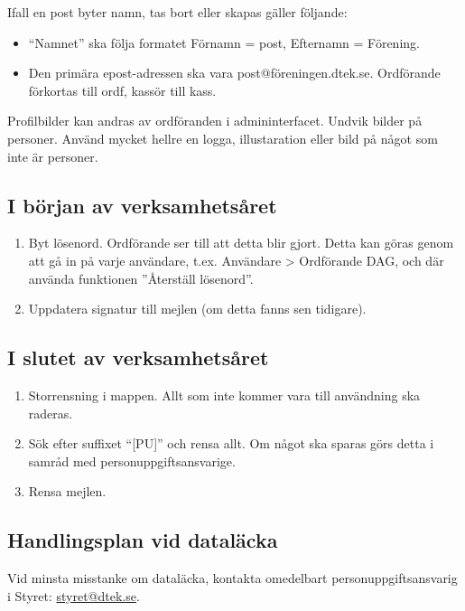 Ifall en post byter namn, tas bort eller skapas gäller följande:
\begin{itemize}
    \item ``Namnet'' ska följa formatet Förnamn = post, Efternamn = Förening.
    \item Den primära epost-adressen ska vara post@föreningen.dtek.se. Ordförande förkortas till ordf, kassör till kass.
\end{itemize}

Profilbilder kan andras av ordföranden i admininterfacet. Undvik bilder på personer. Använd mycket hellre en logga, illustaration eller bild på något som inte är personer. 

\subsection{I början av verksamhetsåret}

\begin{enumerate}
    \item Byt lösenord. Ordförande ser till att detta blir gjort. Detta kan göras genom att gå in på varje användare, t.ex.  Användare > Ordförande DAG, och där använda funktionen ''Återställ lösenord''.
    \item Uppdatera signatur till mejlen (om detta fanns sen tidigare). 
\end{enumerate}

\subsection{I slutet av verksamhetsåret}
\begin{enumerate}
    \item Storrensning i mappen. Allt som inte kommer vara till användning ska raderas.
    \item Sök efter suffixet ``[PU]'' och rensa allt. Om något ska sparas görs detta i samråd med personuppgiftsansvarige.
    \item Rensa mejlen.
\end{enumerate}

\subsection{Handlingsplan vid dataläcka}

Vid minsta misstanke om dataläcka, kontakta omedelbart personuppgiftsansvarig i Styret: \mbox{\href{mailto:styret@dtek.se}{styret@dtek.se}.}

%
%
% 